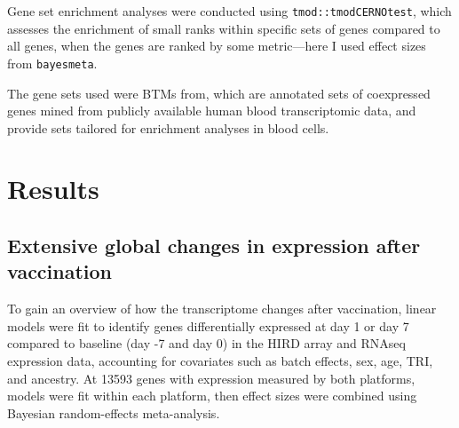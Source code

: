 Gene set enrichment analyses were conducted using \texttt{tmod::tmodCERNOtest}\autocite{weiner3rd2016TmodPackageGeneral}, which assesses the enrichment of small ranks within specific sets of genes compared to all genes, when the genes are ranked by some metric---here I used effect sizes from \texttt{bayesmeta}.
%



The gene sets used were \glspl{BTM} from\autocite{li2013MolecularSignaturesAntibody}, which are annotated sets of coexpressed genes mined from publicly available human blood transcriptomic data, and provide sets tailored for enrichment analyses in blood cells.

\section{Results}

\subsection{Extensive global changes in expression after vaccination}

To gain an overview of how the transcriptome changes after vaccination, linear models were fit to identify genes differentially expressed at day 1 or day 7 compared to baseline (day -7 and day 0) in the \gls{HIRD} array and \gls{RNAseq} expression data, accounting for covariates such as batch effects, sex, age, \gls{TRI}, and ancestry.
At 13593 genes with expression measured by both platforms, models were fit within each platform, then effect sizes were combined using Bayesian random-effects meta-analysis.

